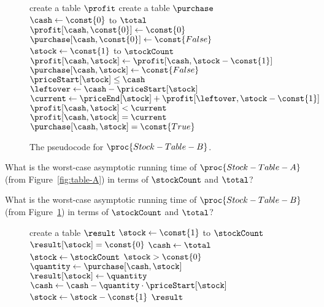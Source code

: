 \documentclass[12pt,twoside]{article}
\newcommand{\answerIIi}{\solution{
10
}}
\newcommand{\answerIIj}{\solution{
10
}}
\begin{document}
\begin{problems}
\begin{figure}[p]
\hfill

\begin{codebox}
\li create a table $\profit$
\li create a table $\purchase$
\li \For $\cash \gets \const{0}$ to $\total$ \Do
\li		$\profit[\cash, \const{0}] \gets \const{0}$
\li		$\purchase[\cash, \const{0}] \gets \const{False}$
\li		\For $\stock \gets \const{1}$ to $\stockCount$ \Do
\li			$\profit[\cash, \stock] \gets
					\profit[\cash, \stock - \const{1}]$
\li			$\purchase[\cash, \stock] \gets \const{False}$
\li			\If $\priceStart[\stock] \le \cash$ \Then
\li				$\leftover \gets \cash - \priceStart[\stock]$
\li				$\current \gets \priceEnd[\stock] +
						\profit[\leftover, \stock - \const{1}]$
\li				\If $\profit[\cash, \stock] < \current$ \Then
\li					$\profit[\cash, \stock] = \current$
\li					$\purchase[\cash, \stock] = \const{True}$
	 			\End
			\End
		\End
	\End
\li \Return \purchase
\end{codebox}
\caption{The pseudocode for $\proc{Stock-Table-B}$.}
\label{fig:table-B}
\end{figure}

\begin{problemparts}
\problempart
{}
What is the worst-case asymptotic running time of
$\proc{Stock-Table-A}$
(from Figure~\ref{fig:table-A})
in terms of $\stockCount$ and $\total$?
\runtimeAnswers

\answerIIi
\end{problemparts}

\begin{problemparts}
\problempart
{}
What is the worst-case asymptotic running time of
$\proc{Stock-Table-B}$
(from Figure~\ref{fig:table-B})
in terms of $\stockCount$ and $\total$?
\runtimeAnswers

\answerIIj
\end{problemparts}

\begin{figure}[p]
\begin{codebox}
\li create a table $\result$
\li \For $\stock \gets \const{1}$ to $\stockCount$ \Do
\li		$\result[\stock] = \const{0}$
 	\End
\li
\li $\cash \gets \total$
\li $\stock \gets \stockCount$
\li \While $\stock > \const{0}$ \Do
\li		$\quantity \gets \purchase[\cash, \stock]$
\li		$\result[\stock] \gets \quantity$
\li		$\cash \gets \cash - \quantity \cdot \priceStart[\stock]$
\li		$\stock \gets \stock - \const{1}$
	\End
\li
\li	\Return $\result$
\end{codebox}


\end{figure}
\end{problems}
\end{document}
